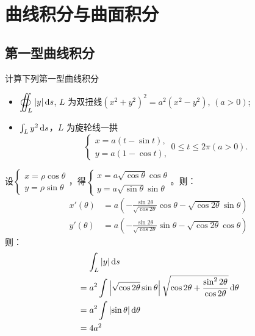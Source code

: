 \chapter{曲线积分与曲面积分}
\section{第一型曲线积分}
\begin{problem}
    计算下列第一型曲线积分
    \begin{itemize}
        \item \(\displaystyle\oiint_{L}|y|\operatorname{d}\!{s}\), \(L\)
            为双扭线\((x^2 + y^2)^2 = a^2
            (x^2 - y^2)\), \((a > 0)\);
        \item \(\int_{L} y^2 \operatorname{d}\!{s}\)，\(L\) 为旋轮线一拱
            \[
                \begin{cases}
                    x = a(t - \sin t), \\
                    y = a(1 - \cos t),
                \end{cases}  0 \leq t \leq 2\pi (a > 0).
            \]
    \end{itemize}

\end{problem}

\begin{solution}
    设\(
        \begin{cases}
            x = \rho \cos \theta \\
            y = \rho \sin \theta
    \end{cases}\)，得\(
        \begin{cases}
            x = a \sqrt{\cos \theta}\cos \theta \\
            y = a \sqrt{\sin \theta}\sin \theta
    \end{cases}\)。则：
    \begin{align*}
        x'(\theta) &= a \left( - \frac{\sin 2\theta}{\sqrt{\cos
        2\theta}} \cos\theta - \sqrt{\cos2\theta} \sin\theta \right)\\
        y'(\theta) &= a \left( - \frac{\sin 2\theta}{\sqrt{\cos
        2\theta}} \sin\theta - \sqrt{\cos2\theta} \cos\theta \right)
    \end{align*}
    则：
    \begin{align*}
        &\mathrel{\phantom{=}} \int_{L} \left| y \right|
        \operatorname{d}\!{s} \\
        &= a^{2} \int \left| \sqrt{\cos2\theta}\sin\theta
        \right|\sqrt{\cos2\theta +
        \frac{\sin^{2}2\theta}{\cos2\theta}} \operatorname{d}\!{\theta} \\
        &= a^{2}\int \left| \sin\theta \right|  \operatorname{d}\!{\theta} \\
        &= 4a^{2}
    \end{align*}
\end{solution}

